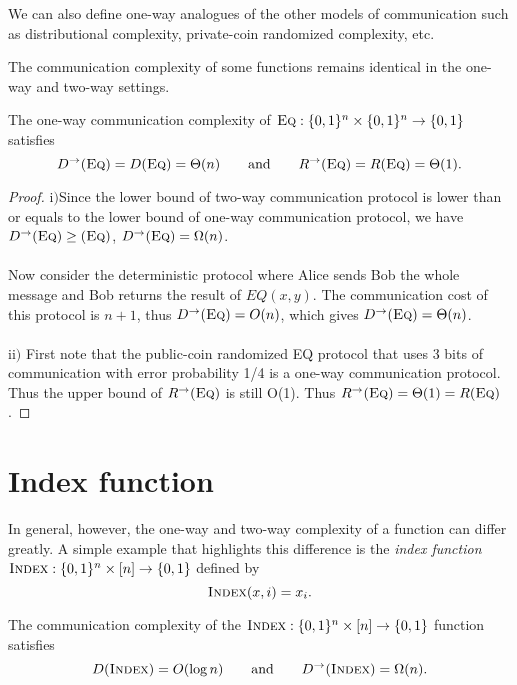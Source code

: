 \begin{remark}
	We can also define one-way analogues of the other models of communication such as distributional complexity, private-coin randomized complexity, etc.
\end{remark}

The communication complexity of some functions remains identical in the one-way and two-way settings.

\begin{theorem}
	The one-way communication complexity of $\textsc{Eq} : \{0,1\}^n \times \{0,1\}^n \to \{0,1\}$ satisfies
	\[
	D^\rightarrow(\textsc{Eq}) = D(\textsc{Eq}) = \Theta(n) \qquad \mbox{and} \qquad 
	R^\rightarrow(\textsc{Eq}) = R(\textsc{Eq}) = \Theta(1).
	\]
\end{theorem}

\begin{proof}
	i$)$Since the lower bound of two-way communication protocol is lower than or equals to the lower bound of one-way communication protocol, we have $D^\rightarrow(\textsc{Eq}) \ge (\textsc{Eq})$, $D^\rightarrow(\textsc{Eq}) = \Omega(n)$.\\
	\\
	Now consider the deterministic protocol where Alice sends Bob the whole message and Bob returns the result of $EQ(x,y)$. The communication cost of this protocol is $n+1$, thus $D^\rightarrow(\textsc{Eq}) = O(n)$, which gives $D^\rightarrow(\textsc{Eq}) = \Theta(n)$.\\
	\\
	ii$)$ First note that the public-coin randomized EQ protocol that uses 3 bits of communication with error probability 1/4 is a one-way communication protocol. Thus the upper bound of $R^\rightarrow(\textsc{Eq})$ is still O(1). Thus $R^\rightarrow(\textsc{Eq})= \Theta(1) = R(\textsc{Eq}) $.
\end{proof}



\section{Index function}

In general, however, the one-way and two-way complexity of a function can differ greatly. A simple example that highlights this difference is the \emph{index function} $\textsc{Index} : \{0,1\}^n \times [n] \to \{0,1\}$ defined by
\[
\textsc{Index}(x,i) = x_i.
\]

\begin{theorem}
	The communication complexity of the $\textsc{Index} : \{0,1\}^n \times [n] \to \{0,1\}$ function satisfies
	\[
	D(\textsc{Index}) = O(\log n) \qquad \mbox{and} \qquad D^\rightarrow(\textsc{Index}) = \Omega(n).
	\]
\end{theorem}

